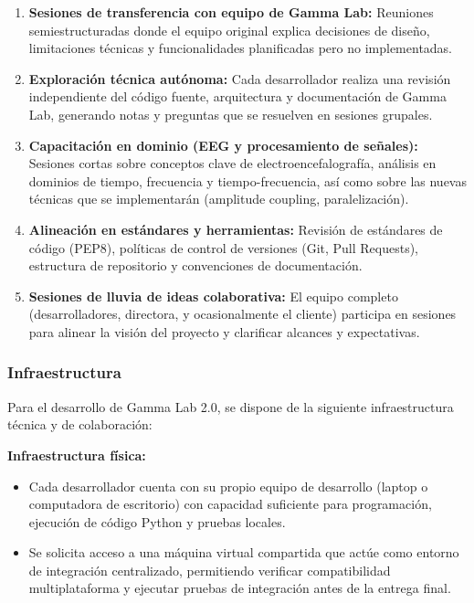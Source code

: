 \documentclass{article}
\begin{document}
\begin{enumerate}
    \item \textbf{Sesiones de transferencia con equipo de Gamma Lab:} Reuniones semiestructuradas donde el equipo original explica decisiones de diseño, limitaciones técnicas y funcionalidades planificadas pero no implementadas.
    
    \item \textbf{Exploración técnica autónoma:} Cada desarrollador realiza una revisión independiente del código fuente, arquitectura y documentación de Gamma Lab, generando notas y preguntas que se resuelven en sesiones grupales.
    
    \item \textbf{Capacitación en dominio (EEG y procesamiento de señales):} Sesiones cortas sobre conceptos clave de electroencefalografía, análisis en dominios de tiempo, frecuencia y tiempo-frecuencia, así como sobre las nuevas técnicas que se implementarán (amplitude coupling, paralelización).
    
    \item \textbf{Alineación en estándares y herramientas:} Revisión de estándares de código (PEP8), políticas de control de versiones (Git, Pull Requests), estructura de repositorio y convenciones de documentación.
    
    \item \textbf{Sesiones de lluvia de ideas colaborativa:} El equipo completo (desarrolladores, directora, y ocasionalmente el cliente) participa en sesiones para alinear la visión del proyecto y clarificar alcances y expectativas.
\end{enumerate}

\subsubsection{Infraestructura}

Para el desarrollo de Gamma Lab 2.0, se dispone de la siguiente infraestructura técnica y de colaboración:

\textbf{Infraestructura física:}
\begin{itemize}
    \item Cada desarrollador cuenta con su propio equipo de desarrollo (laptop o computadora de escritorio) con capacidad suficiente para programación, ejecución de código Python y pruebas locales.
    \item Se solicita acceso a una máquina virtual compartida que actúe como entorno de integración centralizado, permitiendo verificar compatibilidad multiplataforma y ejecutar pruebas de integración antes de la entrega final.
\end{itemize}
\end{document}
